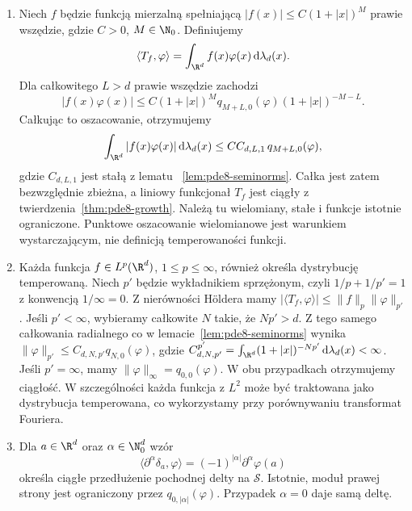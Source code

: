 \begin{przyklad}
\begin{enumerate}
\item Niech $f$ będzie funkcją mierzalną spełniającą
$|f(x)|\le C(1+|x|)^M$ prawie wszędzie,
gdzie $C>0$, $M\in\N_0$.
Definiujemy
\[
 \langle T_f,\varphi\rangle
 =\int_{\R^d}f(x)\varphi(x)\,\mathrm d\lambda_d(x).
\]
Dla całkowitego $L>d$ prawie wszędzie zachodzi
\[
 |f(x)\varphi(x)|
 \le C(1+|x|)^M q_{M+L,0}(\varphi)
              (1+|x|)^{-M-L}.
\]
Całkując to oszacowanie, otrzymujemy
\[
 \int_{\R^d}|f(x)\varphi(x)|\,\mathrm d\lambda_d(x)
 \le C C_{d,L,1}\,q_{M+L,0}(\varphi),
\]
gdzie $C_{d,L,1}$ jest stałą z lematu
~\ref{lem:pde8-seminorms}.
Całka jest zatem bezwzględnie zbieżna,
a liniowy funkcjonał $T_f$ jest ciągły
z twierdzenia~\ref{thm:pde8-growth}.
Należą tu wielomiany, stałe i funkcje istotnie
ograniczone. Punktowe oszacowanie wielomianowe
jest warunkiem wystarczającym, nie definicją
temperowaności funkcji.

\item Każda funkcja $f\in L^p(\R^d)$,
$1\le p\le\infty$, również określa
dystrybucję temperowaną. Niech $p'$ będzie
wykładnikiem sprzężonym, czyli
$1/p+1/p'=1$ z konwencją $1/\infty=0$.
Z nierówności Höldera mamy
$|\langle T_f,\varphi\rangle|\le
\|f\|_p\|\varphi\|_{p'}$.
Jeśli $p'<\infty$, wybieramy całkowite $N$
takie, że $Np'>d$. Z tego samego całkowania
radialnego co w lemacie~\ref{lem:pde8-seminorms}
wynika $\|\varphi\|_{p'}\le
C_{d,N,p'}q_{N,0}(\varphi)$, gdzie
$C_{d,N,p'}^{p'}=\int_{\R^d}(1+|x|)^{-Np'}
\,\mathrm d\lambda_d(x)<\infty$.
Jeśli $p'=\infty$, mamy
$\|\varphi\|_\infty=q_{0,0}(\varphi)$.
W obu przypadkach otrzymujemy ciągłość.
W szczególności każda funkcja z $L^2$
może być traktowana jako dystrybucja temperowana,
co wykorzystamy przy porównywaniu transformat Fouriera.

\item Dla $a\in\R^d$ oraz $\alpha\in\N_0^d$ wzór
\[
 \langle\partial^\alpha\delta_a,\varphi\rangle
 =(-1)^{|\alpha|}\partial^\alpha\varphi(a)
\]
określa ciągłe przedłużenie pochodnej delty
na $\mathcal S$. Istotnie, moduł prawej strony
jest ograniczony przez $q_{0,|\alpha|}(\varphi)$.
Przypadek $\alpha=0$ daje samą deltę.


\end{enumerate}
\end{przyklad}
